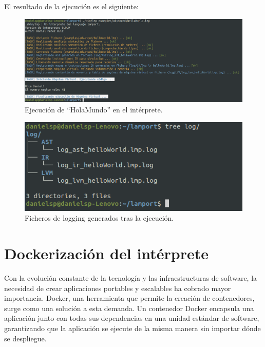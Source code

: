 \vspace{0.5cm}
\noindent
El resultado de la ejecución es el siguiente:
\begin{figure}[h]
    \includegraphics[width=\linewidth]{images/implementacion/ejecucion/lmp_hola_mundo.png}
    \caption{Ejecución de ``HolaMundo'' en el intérprete.}
    \label{fig:ejecucionHolaMundo}
\end{figure}

\begin{figure}[h]
    \includegraphics[width=\linewidth]{images/implementacion/ejecucion/logs.png}
    \caption{Ficheros de logging generados tras la ejecución.}
    \label{fig:logsHolaMundo}
\end{figure}

\section{Dockerización del intérprete}
Con la evolución constante de la tecnología y las infraestructuras de software, la necesidad de crear aplicaciones portables y escalables ha cobrado mayor importancia. Docker, una herramienta que permite la creación de contenedores, surge como una solución a esta demanda. Un contenedor Docker encapsula una aplicación junto con todas sus dependencias en una unidad estándar de software, garantizando que la aplicación se ejecute de la misma manera sin importar dónde se despliegue. 

\vspace{0.5cm}


